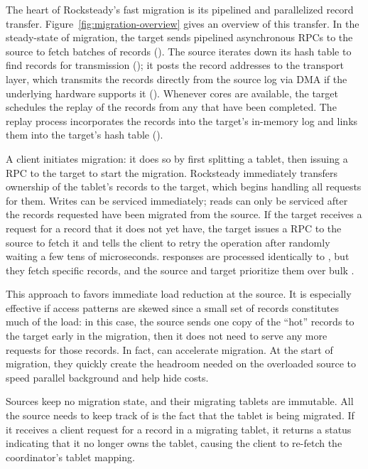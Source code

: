 The heart of Rocksteady's fast migration is its pipelined and
parallelized record transfer. Figure~\ref{fig:migration-overview} gives an
overview of this transfer.  In the steady-state of migration, the target
sends pipelined asynchronous \pull RPCs to the source to
fetch batches of records (\one). The source iterates down its hash table to
find records for transmission (\two); it posts the
record addresses to the transport layer, which transmits the records directly from the source log
via DMA if the underlying hardware supports it (\three). Whenever cores are available, the target schedules the
    replay of the records from any \pulls that have been completed. The replay process
incorporates the records into the target's in-memory log and links them
into the target's hash table (\four).

A client initiates migration: it does so by first splitting a tablet,
then issuing a \mt
RPC to the target to start the migration.
Rocksteady immediately transfers ownership of the tablet's records to the target,
which begins handling all requests for them.
Writes can be serviced immediately; reads can only be serviced after
the records requested have been migrated from the source.  If the target
receives a request for a record that it does not yet have, the 
target issues a \priopull RPC to the
source to fetch it and tells the client to retry the operation after randomly waiting a
few tens of microseconds. \priopull{} responses are processed identically to
\pulls, but they fetch specific records, and the source and target prioritize
them over bulk \pulls.

This approach to \priopulls favors immediate load
reduction at the source. It is especially effective if access patterns are
skewed since a small set of records constitutes much of the load: in this
case, the source sends one copy of the ``hot'' records to the target early
in the migration, then it does not need to serve any more requests for those
records.  In fact, \priopulls can
accelerate migration. At the start of migration, they quickly create the
headroom needed on the overloaded source to speed parallel background \pulls
and help hide \pull costs.

Sources
keep no migration state, and their migrating tablets are immutable. All the
source needs to keep track of is the fact that the tablet is being
migrated.
If
it receives a client request for a record in a migrating tablet,
it returns a status indicating that it no longer owns the tablet, causing the
client to re-fetch the coordinator's tablet mapping.

